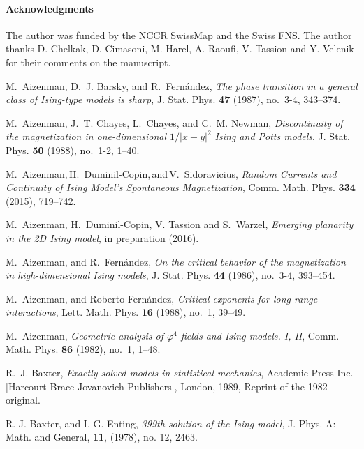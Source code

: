 \documentclass[a4paper,oneside,11pt]{article}
\begin{document}
\paragraph{Acknowledgments} The author was funded by the NCCR SwissMap and the Swiss FNS. The author thanks D. Chelkak, D. Cimasoni, M. Harel, A. Raoufi, V. Tassion and Y. Velenik for their comments on the manuscript.
\begin{thebibliography}{7}

M.~Aizenman, D.~J. Barsky, and R.~Fern{{\'a}}ndez, \emph{The phase
  \mbox{transition} in a general class of {I}sing-type models is sharp}, J.
  Stat. Phys. \textbf{47} (1987), no.~3-4, 343--374. 

M.~Aizenman, J.~T. Chayes, L.~Chayes, and C.~M. Newman, \emph{Discontinuity of
  the magnetization in one-dimensional {$1/\vert x-y\vert ^2$} {I}sing and
  {P}otts models}, J. Stat. Phys. \textbf{50} (1988), no.~1-2, 1--40.

M.~Aizenman,\,H.~Duminil-Copin,\,and\,V.~Sidoravicius, \emph{Random {C}urrents
  and \mbox{{C}ontinuity} of {I}sing {M}odel's {S}pontaneous {M}agnetization},
  Comm. Math. Phys. \textbf{334} (2015), 719--742.
  
M.~Aizenman, H.~Duminil-Copin, V. Tassion and S.~Warzel, \emph{Emerging planarity in the 2D Ising model},
 in preparation (2016).


M.~Aizenman, and R.~Fern{\'a}ndez, \emph{On the critical behavior of the
  magnetization in high-dimensional {I}sing models}, J. Stat. Phys. \textbf{44}
  (1986), no.~3-4, 393--454.
  
M.~Aizenman, and Roberto Fern{{\'a}}ndez, \emph{Critical exponents for
  long-range interactions}, Lett. Math. Phys. \textbf{16} (1988), no.~1,
  39--49.
  
M.~Aizenman, \emph{Geometric analysis of {$\varphi ^{4}$} fields and {I}sing
  models. {I}, {II}}, Comm. Math. Phys. \textbf{86} (1982), no.~1, 1--48.

R.~J. Baxter, \emph{Exactly solved models in statistical mechanics},
  Academic Press Inc. [Harcourt Brace Jovanovich Publishers], London, 1989,
  Reprint of the 1982 original. 
  
R. J. Baxter, and I. G. Enting, {\em 399th solution of the Ising model}, J. Phys. A: Math. and General, {\bf 11},
 (1978), no. 12, 2463.
 

\end{thebibliography}
\end{document}
